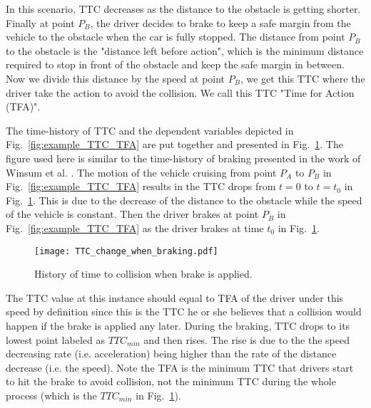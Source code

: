 In this scenario, TTC decreases as the distance to the obstacle is getting shorter. Finally at point $P_B$, the driver decides to brake to keep a safe margin from the vehicle to the obstacle when the car is fully stopped. The distance from point $P_B$ to the obstacle is the "distance left before action", which is the minimum distance required to stop in front of the obstacle and keep the safe margin in between. Now we divide this distance by the speed at point $P_B$, we get this TTC where the driver take the action to avoid the collision. We call this TTC "Time for Action (TFA)". 

The time-history of TTC and the dependent variables depicted in Fig.~\ref{fig:example_TTC_TFA} are put together and presented in Fig.~\ref{fig:TTC_history}. The figure used here is similar to the time-history of braking presented in the work of Winsum et al. \cite{time_history}. The motion of the vehicle cruising from point $P_A$ to $P_B$ in Fig.~\ref{fig:example_TTC_TFA} results in the TTC drops from $t=0$ to $t=t_0$ in Fig.~\ref{fig:TTC_history}. This is due to the decrease of the distance to the obstacle while the speed of the vehicle is constant. Then the driver brakes at point $P_B$ in Fig.~\ref{fig:example_TTC_TFA} as the driver brakes at time $t_0$ in Fig.~\ref{fig:TTC_history}. 

\begin{figure}[htbp!]
\begin{center}
\texttt{[image: TTC\_change\_when\_braking.pdf]}
\end{center}
\caption{History of time to collision when brake is applied.}
\label{fig:TTC_history} 
\end{figure}

The TTC value at this instance should equal to TFA of the driver under this speed by definition since this is the TTC he or she believes that a collision would happen if the brake is applied any later. During the braking, TTC drops to its lowest point labeled as $TTC_{min}$ and then rises. The rise is due to the the speed decreasing rate (i.e. acceleration) being higher than the rate of the distance decrease (i.e. the speed). Note the TFA is the minimum TTC that drivers start to hit the brake to avoid collision, not the minimum TTC during the whole process (which is the $TTC_{min}$ in Fig.~\ref{fig:TTC_history}).

